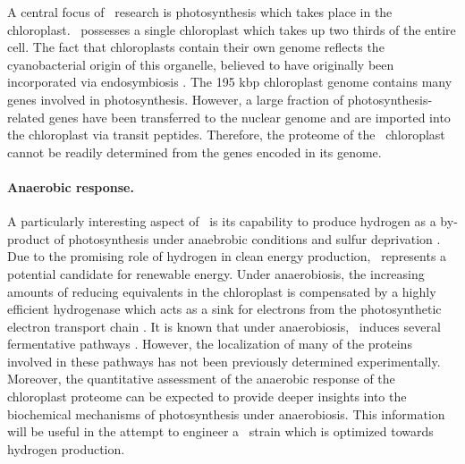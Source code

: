 A central focus of \cre~research is photosynthesis which takes place in the 
chloroplast.
\cre~possesses a single chloroplast which takes up two thirds of the entire cell.
The fact that chloroplasts contain their own genome reflects the cyanobacterial
origin of this organelle, believed to have originally been incorporated 
via endosymbiosis \citep{Gould2008}.
The 195 kbp chloroplast genome contains many genes involved in photosynthesis.
However, a large fraction of photosynthesis-related genes have been transferred
to the nuclear genome \citep{Blanchard2000} and are imported into the 
chloroplast via transit peptides.
Therefore, the proteome of the \cre~chloroplast cannot be readily determined 
from the genes encoded in its genome.

\paragraph{Anaerobic response.}

A particularly interesting aspect of \cre~is its capability to produce
hydrogen as a by-product of photosynthesis under anaebrobic conditions 
\citep{Greenbaum1982} and sulfur deprivation \citep{Fouchard2005}.
Due to the promising role of hydrogen in clean energy production, 
\cre~represents a potential candidate for renewable energy.
Under anaerobiosis, the increasing amounts of reducing equivalents in the 
chloroplast is compensated by a highly efficient hydrogenase which acts as a 
sink for electrons from the photosynthetic electron transport chain 
\citep{Happe2002, Hemschemeier2011}.
It is known that under anaerobiosis, \cre~induces several fermentative
pathways \citep{Grossman2011}.
However, the localization of many of the proteins involved in these pathways
has not been previously determined experimentally.
Moreover, the quantitative assessment of the anaerobic response of the
chloroplast proteome can be expected to provide deeper insights into
the biochemical mechanisms of photosynthesis under anaerobiosis.
This information will be useful in the attempt to engineer a \cre~strain which 
is optimized towards hydrogen production.

% 
% 
% 
